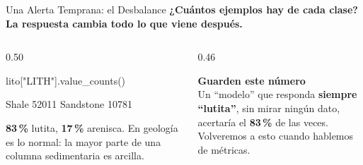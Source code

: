 \documentclass[aspectratio=169, 11pt]{beamer}
\begin{document}
\begin{frame}[fragile,shrink=12]{Una Alerta Temprana: el Desbalance}
  \vspace{-4pt}
  {\small\color{arcaDark}\bfseries
    ¿Cuántos ejemplos hay de cada clase? La respuesta cambia todo lo que viene después.}

  \vspace{4pt}
  \begin{columns}[T]
    \begin{column}{0.50\textwidth}
      \begin{pyblock}
lito["LITH"].value_counts()
      \end{pyblock}
      \vspace{2pt}
      \begin{outputblock}
Shale        52011
Sandstone    10781
      \end{outputblock}
      \vspace{4pt}
      {\scriptsize\color{textMuted}
        \textbf{83\,\%} lutita, \textbf{17\,\%} arenisca.
        En geología es lo normal: la mayor parte de
        una columna sedimentaria es arcilla.}
    \end{column}
    \begin{column}{0.46\textwidth}
      \begin{tcolorbox}[colback=arcaGray, colframe=codeOrange, boxrule=0pt, leftrule=3pt,
        arc=3pt, left=6pt, right=6pt, top=5pt, bottom=5pt]
        {\scriptsize\color{codeOrange}\bfseries\faExclamationTriangle\hspace{4pt}Guarden este número}\\[4pt]
        {\scriptsize\color{textMuted}
          Un ``modelo'' que responda \textbf{siempre ``lutita''},
          sin mirar ningún dato, acertaría el
          \textbf{83\,\%} de las veces.\\[4pt]
          Volveremos a esto cuando hablemos de métricas.}
      \end{tcolorbox}
    \end{column}
  \end{columns}
\end{frame}
\end{document}
